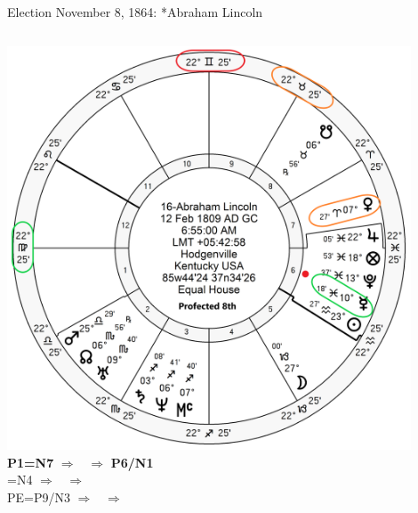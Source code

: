 \begin{frame}[t]{Election November 8, 1864: *Abraham Lincoln}
\begin{columns}[T, onlytextwidth]
\vspace{-1em}
{\includegraphics[width=0.9\textwidth]{charts/Lincoln-Prof-8th.png}}
\textbf{\dgreen P1=N7} $\Rightarrow$ \Mercury\, $\Rightarrow$ \textbf{\dgreen P6/N1} \\
\textbf{}=N4 $\Rightarrow$  \Mercury\, $\Rightarrow$  \textbf{} \\
PE=P9/N3 $\Rightarrow$  \Venus\, $\Rightarrow$  \textbf{}

\end{columns}
\end{frame}

